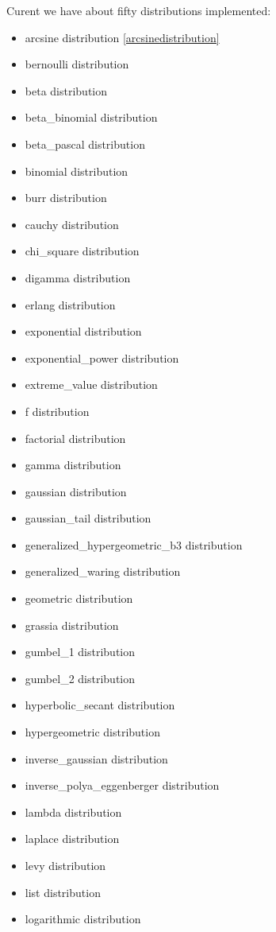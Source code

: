 Curent we have about fifty distributions implemented:
\begin{itemize}
    \item arcsine distribution \ref{arcsinedistribution}
    \item bernoulli distribution
    \item beta distribution
    \item beta\_binomial distribution
    \item beta\_pascal distribution
    \item binomial distribution
    \item burr distribution
    \item cauchy distribution
    \item chi\_square distribution
    \item digamma distribution
    \item erlang distribution
    \item exponential distribution
    \item exponential\_power distribution
    \item extreme\_value distribution
    \item f distribution
    \item factorial distribution
    \item gamma distribution
    \item gaussian distribution
    \item gaussian\_tail distribution
    \item generalized\_hypergeometric\_b3 distribution
    \item generalized\_waring distribution
    \item geometric distribution
    \item grassia distribution
    \item gumbel\_1 distribution
    \item gumbel\_2 distribution
    \item hyperbolic\_secant distribution
    \item hypergeometric distribution
    \item inverse\_gaussian distribution
    \item inverse\_polya\_eggenberger distribution
    \item lambda distribution
    \item laplace distribution
    \item levy distribution
    \item list distribution
    \item logarithmic distribution

\end{itemize}
